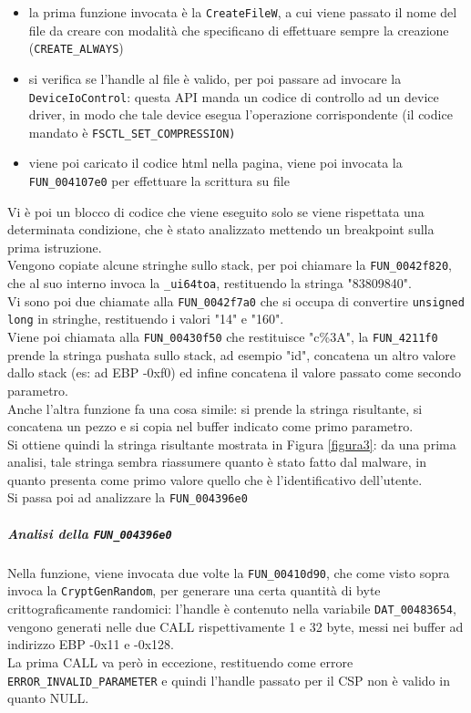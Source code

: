 \documentclass[12pt]{extarticle}
\begin{document}
\begin{itemize}
    \item la prima funzione invocata è la \texttt{CreateFileW}, a cui viene passato il nome del file da creare con modalità che specificano di effettuare sempre la creazione (\texttt{CREATE\_ALWAYS})
    \item si verifica se l'handle al file è valido, per poi passare ad invocare la \texttt{DeviceIoControl}: questa API manda un codice di controllo ad un device driver, in modo che tale device esegua l'operazione corrispondente (il codice mandato è \texttt{FSCTL\_SET\_COMPRESSION)}
    \item viene poi caricato il codice html nella pagina, viene poi invocata la \texttt{FUN\_004107e0} per effettuare la scrittura su file
\end{itemize}
Vi è poi un blocco di codice che viene eseguito solo se viene rispettata una determinata condizione, che è stato analizzato mettendo un breakpoint sulla prima istruzione.\\Vengono copiate alcune stringhe sullo stack, per poi chiamare la \texttt{FUN\_0042f820}, che al suo interno invoca la \texttt{\_ui64toa}, restituendo la stringa "83809840".\\Vi sono poi due chiamate alla \texttt{FUN\_0042f7a0} che si occupa di convertire \texttt{unsigned long} in stringhe, restituendo i valori "14" e "160".\\Viene poi chiamata alla \texttt{FUN\_00430f50} che restituisce "c\%3A", la \texttt{FUN\_4211f0} prende la stringa pushata sullo stack, ad esempio "id", concatena un altro valore dallo stack (es: ad EBP -0xf0) ed infine concatena il valore passato come secondo parametro.\\Anche l'altra funzione fa una cosa simile: si prende la stringa risultante, si concatena un pezzo e si copia nel buffer indicato come primo parametro.\\Si ottiene quindi la stringa risultante mostrata in Figura \ref{figura3}: da una prima analisi, tale stringa sembra riassumere quanto è stato fatto dal malware, in quanto presenta come primo valore quello che è l'identificativo dell'utente.\\Si passa poi ad analizzare la \texttt{\texttt{FUN\_004396e0}}

\subparagraph{Analisi della \texttt{FUN\_004396e0}} Nella funzione, viene invocata due volte la \texttt{FUN\_00410d90}, che come visto sopra invoca la \texttt{CryptGenRandom}, per generare una certa quantità di byte crittograficamente randomici: l'handle è contenuto nella variabile \texttt{DAT\_00483654}, vengono generati nelle due CALL rispettivamente 1 e 32 byte, messi nei buffer ad indirizzo EBP -0x11 e -0x128.\\La prima CALL va però in eccezione, restituendo come errore \texttt{ERROR\_INVALID\_PARAMETER} e quindi l'handle passato per il CSP non è valido in quanto NULL.
\end{document}

